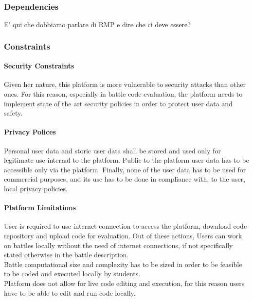 \subsubsection{Dependencies}

E' qui che dobbiamo parlare di RMP e dire che ci deve essere?

\subsubsection{Constraints}
\paragraph{Security Constraints}
Given her nature, this platform is more vulnerable to security attacks than other ones. For this reason, especially in battle code evaluation, the platform needs to implement state of the art security policies in order to protect user data and safety.
\paragraph{Privacy Polices}
Personal user data and storic user data shall be stored and used only for legitimate use internal to the platform. Public to the platform user data has to be accessible only via the platform. Finally, none of the user data has to be used for commercial purposes, and its use has to be done in compliance with, to the user, local privacy policies. 
\paragraph{Platform Limitations}
User is required to use internet connection to access the platform, download code repository and upload code for evaluation. Out of these actions, Users can work on battles locally without the need of internet connections, if not specifically stated otherwise in the battle description.\\
Battle computational size and complexity has to be sized in order to be feasible to be coded and executed locally by students.\\
Platform does not allow for live code editing and execution, for this reason users have to be able to edit and run code locally.
